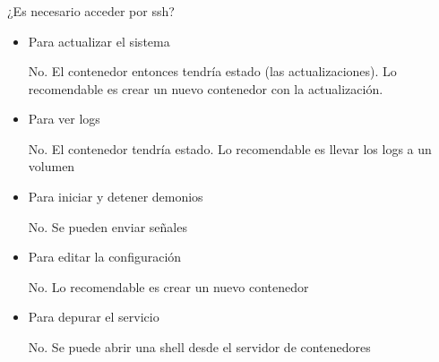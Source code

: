 \documentclass[ucs]{beamer}
\begin{document}
\begin{frame}[fragile]
\frametitle{}
¿Es necesario acceder por ssh?
\begin{itemize}
\item
Para actualizar el sistema

No. El contenedor entonces tendría estado (las actualizaciones).
Lo recomendable es crear un nuevo contenedor con la actualización. 
\item
Para ver logs

No. El contenedor tendría estado. Lo recomendable es llevar los logs
a un volumen

\item
Para iniciar y detener demonios

No. Se pueden enviar señales


\item
Para editar la configuración

No. Lo recomendable es crear un nuevo contenedor

\item
Para depurar el servicio

No. Se puede abrir una shell desde el servidor de contenedores

\end{itemize}

\end{frame}
\end{document}

